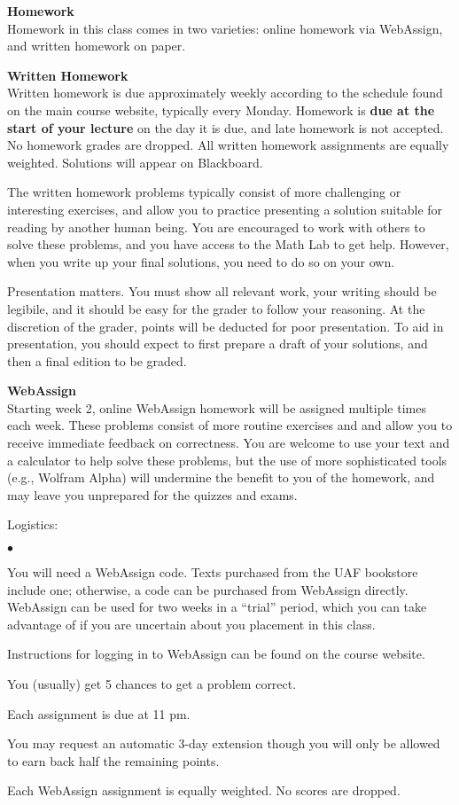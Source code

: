 \documentclass[12pt]{article}
\renewcommand{\emph}[1]{\textsf{\textbf{#1}}}
\newcommand{\localhead}[1]{\par\smallskip\textbf{#1}\nobreak\\}%
\def\heading#1{\localhead{\large\emph{#1}}}
\def\subheading#1{\localhead{\emph{#1}}}
\newenvironment{clist}%
{\bgroup\parskip 0pt\begin{list}{$\bullet$}{\partopsep 4pt\topsep 0pt\itemsep -2pt}}%
{\end{list}\egroup}%
\begin{document}
\heading{Homework}
Homework in this class comes in two varieties: online homework via WebAssign, and written homework on paper.

\subheading{Written Homework}
Written homework is due approximately weekly according to the schedule
found on the main course website, typically every Monday.  
Homework is \textbf{due at the start of your lecture} 
on the day it is due, and
late homework is not accepted. No homework grades are dropped. All written homework assignments are equally weighted. Solutions will appear on Blackboard. 

The written homework problems typically consist of more challenging
or interesting exercises, and allow you to practice presenting 
a solution suitable for reading by another human being. You are 
encouraged to work with others to solve these problems, and you 
have access to the Math Lab to get help.  However, when you 
write up your final solutions, you need to do so on your own.

Presentation matters. You must show all relevant work, your writing
should be legibile, and it should be easy for the grader to follow
your reasoning. At the discretion of the grader, points will be deducted 
for poor presentation.  To aid in presentation, you should expect
to first prepare a draft of your solutions, and then a final edition to
be graded.

\subheading{WebAssign} 
Starting week 2, online WebAssign homework will be assigned multiple times each week. These problems consist of more routine exercises and and allow
you to receive immediate feedback on correctness.  You are welcome
to use your text and a calculator to help solve these problems, but
the use of more sophisticated tools (e.g., Wolfram Alpha) will undermine
the benefit to you of the homework, and may leave you unprepared for
the quizzes and exams.

Logistics:

\begin{clist}
\item You will need a WebAssign code.  Texts purchased from the UAF 
bookstore include one; otherwise, a code can be purchased from
WebAssign directly. WebAssign can be used for two weeks in a ``trial''
period, which you can take advantage of if you are uncertain about
you placement in this class.
\item Instructions for logging in to WebAssign can be found on the course website.
\item You (usually) get 5 chances to get a problem correct. 
\item Each assignment is due at 11 pm. 
\item You may request an automatic 3-day extension though you will only be allowed to earn back half the remaining points. 
\item Each WebAssign assignment is equally weighted. No scores are dropped.
\end{clist}
\end{document}
